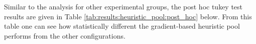 \begin{table}[htbp]
	\centering
	\caption{ANOVA - Rank - BHH Variant: Heuristic Pool}
	\label{tab:results:heuristic_pool:anova}%
	\par\bigskip
\end{table}

Similar to the analysis for other experimental groups, the post hoc tukey test results are given in Table \ref{tab:results:heuristic_pool:post_hoc} below. From this table one can see how statistically different the gradient-based heuristic pool performs from the other configurations.

